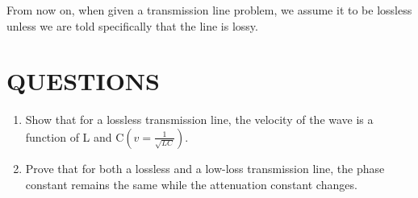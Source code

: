 From now on, when given a transmission line problem, we assume it to be lossless unless we are told specifically that the line is lossy.


\newpage
\section*{QUESTIONS}
\begin{enumerate}
	\item Show that for a lossless transmission line, the velocity of the wave is a function of L and C$( v = \frac{1}{\sqrt{LC}})$.
	
	\item Prove that for both a lossless and a low-loss transmission line, the phase constant remains the same while the attenuation constant changes.
\end{enumerate}